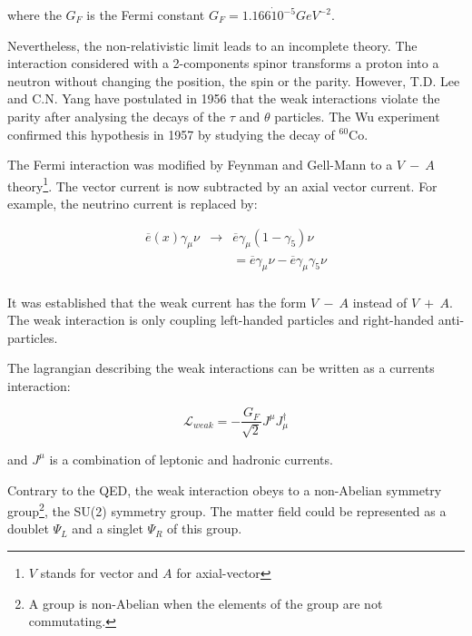     where the $G_F$ is the Fermi constant $G_F = 1.166 \dot 10^{-5} GeV^{-2}$. 
    
    Nevertheless, the non-relativistic limit leads to an incomplete theory.
    The interaction considered with a 2-components spinor transforms a proton into a neutron without changing the position, the spin or the parity.
    However, T.D. Lee and C.N. Yang have postulated in 1956 that the weak interactions violate the parity after analysing the decays of the $\tau$ and $\theta$ particles\cite{1956PhRv..104..254L}.
    The Wu experiment \cite{1957PhRv..105.1413W} confirmed this hypothesis in 1957 by studying the decay of $^{60}$Co.

    The Fermi interaction was modified by Feynman and Gell-Mann\cite{PhysRev.109.193} to a $V \ - \ A$ theory\footnote{$V$ stands for vector and $A$ for axial-vector}.
    The vector current is now subtracted by an axial vector current. For example, the neutrino current is replaced by:

    \begin{equation}
        \begin{array}{rcc}
        \overline{e}(x) \gamma_{\mu} \nu & \rightarrow & \overline{e}\gamma_{\mu}(1 - \gamma_5 ) \nu \\
            & & = \overline{e} \gamma_{\mu} \nu - \overline{e}\gamma_{\mu} \gamma_5 \nu \\
        \end{array}
    \end{equation}

    It was established that the weak current has the form $V \ - \ A$ instead of $V \ + \ A$.
    The weak interaction is only coupling left-handed particles and right-handed anti-particles.
    
    The lagrangian describing the weak interactions can be written as a currents interaction:

    \begin{equation}
      \mathcal{L}_{weak} = - \frac{G_F}{\sqrt{2}} J^{\mu}J_{\mu}^{\dagger}
    \end{equation}
    
     and $J^{\mu}$ is a combination of leptonic and hadronic currents.

    Contrary to the QED, the weak interaction obeys to a non-Abelian symmetry group\footnote{A group is non-Abelian when the elements of the group are not commutating.}, the SU(2) symmetry group.
    The matter field could be represented as a doublet $\Psi_L$ and a singlet $\Psi_R$ of this group.

